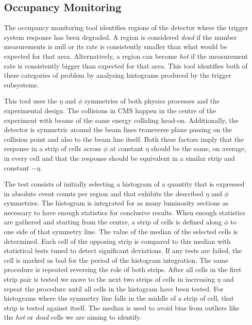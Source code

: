 \subsection{Occupancy Monitoring}


The occupancy monitoring tool identifies regions of the detector where the trigger system response has been degraded. A region is considered \textit{dead} if the number measurements is null or its rate is consistently smaller than what would be expected for that area. Alternatively, a region can become \textit{hot} if the measurement rate is consistently bigger than expected for that area. This tool identifies both of these categories of problem by analysing histograms produced by the trigger subsystems.

This tool uses the $\eta$ and $\phi$ symmetries of both physics processes and the experimental design. The collisions in \gls{CMS} happen in the centre of the experiment with beams of the same energy colliding head-on. Additionally, the detector is symmetric around the beam lines transverse plane passing on the collision point and also to the beam line itself. Both these factors imply that the response in a strip of cells across $\phi$ at constant $\eta$ should be the same, on average, in every cell and that the response should be equivalent in a similar strip and constant $-\eta$.

The test consists of initially selecting a histogram of a quantity that is expressed in absolute event counts per region and that exhibits the described $\eta$ and $\phi$ symmetries. The histogram is integrated for as many luminosity sections as necessary to have enough statistics for conclusive results. When enough statistics are gathered and starting from the centre, a strip of cells is defined along $\phi$ to one side of that symmetry line. The value of the median of the selected cells is determined. Each cell of the opposing strip is compared to this median with statistical tests tuned to detect significant deviations. If any tests are failed, the cell is marked as bad for the period of the histogram integration. The same procedure is repeated reversing the role of both strips. After all cells in the first strip pair is tested we move to the next two strips of cells in increasing $\eta$ and repeat the procedure until all cells in the histogram have been tested. For histograms where the symmetry line falls in the middle of a strip of cell, that strip is tested against itself. The median is used to avoid bias from outliers like the \textit{hot} or \textit{dead} cells we are aiming to identify. 

